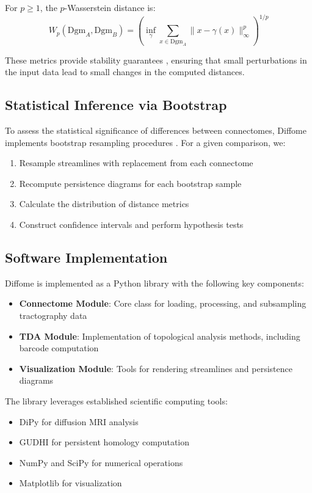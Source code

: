 \documentclass[12pt,a4paper]{article}
\begin{document}
For $p \geq 1$, the $p$-Wasserstein distance is:
\begin{equation}
W_p(\text{Dgm}_A, \text{Dgm}_B) = \left(\inf_{\gamma} \sum_{x \in \text{Dgm}_A} \|x - \gamma(x)\|_\infty^p\right)^{1/p}
\end{equation}

These metrics provide stability guarantees \citep{skraba2020wasserstein}, ensuring that small perturbations in the input data lead to small changes in the computed distances.

\subsection{Statistical Inference via Bootstrap}

To assess the statistical significance of differences between connectomes, Diffome implements bootstrap resampling procedures \citep{efron1992bootstrap}. For a given comparison, we:
\begin{enumerate}
    \item Resample streamlines with replacement from each connectome
    \item Recompute persistence diagrams for each bootstrap sample
    \item Calculate the distribution of distance metrics
    \item Construct confidence intervals and perform hypothesis tests
\end{enumerate}

\subsection{Software Implementation}

Diffome is implemented as a Python library with the following key components:

\begin{itemize}
    \item \textbf{Connectome Module}: Core class for loading, processing, and subsampling tractography data
    \item \textbf{TDA Module}: Implementation of topological analysis methods, including barcode computation
    \item \textbf{Visualization Module}: Tools for rendering streamlines and persistence diagrams
\end{itemize}

The library leverages established scientific computing tools:
\begin{itemize}
    \item DiPy for diffusion MRI analysis \citep{garyfallidis2014dipy}
    \item GUDHI for persistent homology computation \citep{maria2014gudhi}
    \item NumPy and SciPy for numerical operations
    \item Matplotlib for visualization
\end{itemize}
\end{document}
